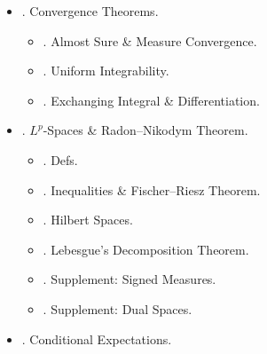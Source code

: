 \documentclass{article}
\newtheorem{theorem}{Theorem}
\begin{document}
\begin{enumerate}
\begin{itemize}
\begin{itemize}
			\item {. Weak Law of Large Numbers.}
			
			\begin{theorem}[Markov inequality, Chebyshev inequality]
				Let $X$ be a real random variable \& let $f:[0,\infty)\to[0,\infty)$ be monotone increasing. Then for any $\varepsilon > 0$ with $f(\varepsilon) > 0$, {\rm Markov inequality} holds
				\begin{equation}
					{\bf P}[|X|\ge\varepsilon]\le\frac{{\bf E}[f(|X|)]}{f(\varepsilon)}.
				\end{equation}
				In special case $f(x) = x^2$, get ${\bf P}[|X|\ge\varepsilon]\le\varepsilon^{-2}{\bf E}[X^2]$. In particular, if $X\in L^2({\bf P})$, {\rm Chebyshev inequality} holds:
				\begin{equation}
					{\bf P}[|X - {\bf E}[X]|\ge\varepsilon]\le\varepsilon^{-2}{\rm Var}[X].
				\end{equation}
			\end{theorem}
			\item {. Strong Law of Large Numbers.}
			\item {. Speed of Convergence in Strong LLN.}
			\item { Poisson Process.}
		\end{itemize}
		\item {. Convergence Theorems.}
		\begin{itemize}
			\item {. Almost Sure \& Measure Convergence.}
			\item {. Uniform Integrability.}
			\item {. Exchanging Integral \& Differentiation.}
		\end{itemize}
		\item {. $L^p$-Spaces \& Radon--Nikodym Theorem.}
		\begin{itemize}
			\item {. Defs.}
			\item {. Inequalities \& Fischer--Riesz Theorem.}
			\item {. Hilbert Spaces.}
			\item {. Lebesgue's Decomposition Theorem.}
			\item {. Supplement: Signed Measures.}
			\item {. Supplement: Dual Spaces.}
		\end{itemize}
		\item {. Conditional Expectations.}

\end{itemize}
\end{enumerate}
\end{document}
